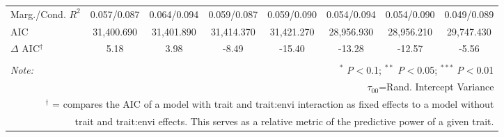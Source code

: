 \documentclass[12pt, letterpaper]{article}
\begin{document}
\begin{table}[h]
{\begin{tabular}{lccccccc}
 Marg./Cond. $R^2$ & 0.057/0.087 &	0.064/0.094&	0.059/0.087	&0.059/0.090&	0.054/0.094	& 0.054/0.090 &	0.049/0.089 \\
\rowcolor[gray]{.95} AIC & 31,400.690 & 31,401.890 & 31,414.370 & 31,421.270 & 28,956.930 & 28,956.210 & 29,747.430  \\  
\hline 
$\Delta$ AIC$^\dagger$  & 5.18 & 3.98 & -8.49 & -15.40 & -13.28 & -12.57 & -5.56 \\
\hline 
\hline \\[-1.8ex] 
\textit{Note:}  & \multicolumn{7}{r}{$^{*}$ \textit{P}$<$0.1; $^{**}$ \textit{P}$<$0.05; $^{***}$ \textit{P}$<$0.01} \\ 
\multicolumn{8}{r}{$\tau_{00}$=Rand. Intercept Variance}\\ 
\multicolumn{8}{r}{$^\dagger$ = compares the AIC of a model with trait and trait:envi interaction as fixed effects to a model without}\\
\multicolumn{8}{r}{trait and trait:envi effects. This serves as a relative metric of the predictive power of a given trait.}
\end{tabular}}
\end{table} 
\end{document}
